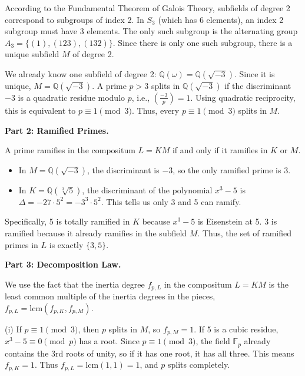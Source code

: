 \begin{solution}
\bigskip

According to the Fundamental Theorem of Galois Theory, subfields of degree 2 correspond to subgroups of index 2. In $S_3$ (which has 6 elements), an index 2 subgroup must have 3 elements. The only such subgroup is the alternating group $A_3 = \{ (1), (123), (132) \}$. Since there is only one such subgroup, there is a unique subfield $M$ of degree 2.

\bigskip

We already know one subfield of degree 2: $\mathbb{Q}(\omega) = \mathbb{Q}(\sqrt{-3})$. Since it is unique, $M = \mathbb{Q}(\sqrt{-3})$. A prime $p > 3$ splits in $\mathbb{Q}(\sqrt{-3})$ if the discriminant $-3$ is a quadratic residue modulo $p$, i.e., $\left(\frac{-3}{p}\right) = 1$. Using quadratic reciprocity, this is equivalent to $p \equiv 1 \pmod 3$. Thus, every $p \equiv 1 \pmod 3$ splits in $M$.

\bigskip

\textbf{Part 2: Ramified Primes.}

A prime ramifies in the compositum $L = KM$ if and only if it ramifies in $K$ or $M$.
\begin{itemize}
    \item In $M = \mathbb{Q}(\sqrt{-3})$, the discriminant is $-3$, so the only ramified prime is 3.
    \item In $K = \mathbb{Q}(\sqrt[3]{5})$, the discriminant of the polynomial $x^3-5$ is $\Delta = -27 \cdot 5^2 = -3^3 \cdot 5^2$. This tells us only 3 and 5 can ramify.
\end{itemize}

\bigskip

Specifically, 5 is totally ramified in $K$ because $x^3-5$ is Eisenstein at 5. 3 is ramified because it already ramifies in the subfield $M$. Thus, the set of ramified primes in $L$ is exactly $\{3, 5\}$.

\bigskip

\textbf{Part 3: Decomposition Law.}

We use the fact that the inertia degree $f_{p, L}$ in the compositum $L=KM$ is the least common multiple of the inertia degrees in the pieces, $f_{p, L} = \mathrm{lcm}(f_{p, K}, f_{p, M})$.

\bigskip

(i) If $p \equiv 1 \pmod 3$, then $p$ splits in $M$, so $f_{p, M} = 1$. If 5 is a cubic residue, $x^3-5 \equiv 0 \pmod p$ has a root. Since $p \equiv 1 \pmod 3$, the field $\mathbb{F}_p$ already contains the 3rd roots of unity, so if it has one root, it has all three. This means $f_{p, K} = 1$. Thus $f_{p, L} = \mathrm{lcm}(1, 1) = 1$, and $p$ splits completely.


\end{solution}
